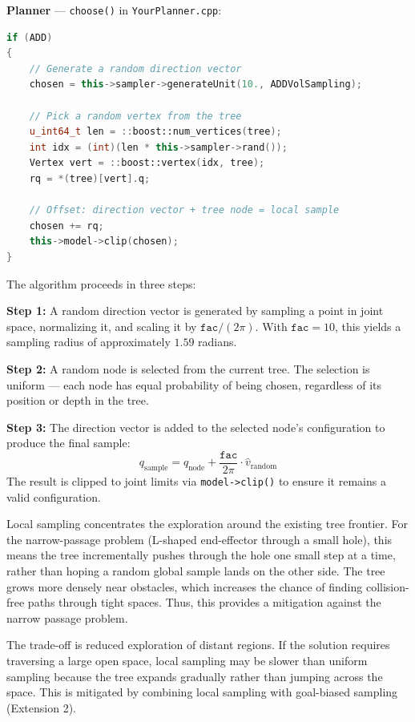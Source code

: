 \documentclass[a4paper,12pt]{article}
\begin{document}
\textbf{Planner} --- \texttt{choose()} in \texttt{YourPlanner.cpp}:
\begin{lstlisting}[language=C++, caption=Implementation of Extension 1]
if (ADD)
{
    // Generate a random direction vector
    chosen = this->sampler->generateUnit(10., ADDVolSampling);

    // Pick a random vertex from the tree
    u_int64_t len = ::boost::num_vertices(tree);
    int idx = (int)(len * this->sampler->rand());
    Vertex vert = ::boost::vertex(idx, tree);
    rq = *(tree)[vert].q;

    // Offset: direction vector + tree node = local sample
    chosen += rq;
    this->model->clip(chosen);
}
\end{lstlisting}
The algorithm proceeds in three steps:

\textbf{Step 1:} A random direction vector is generated by sampling a point in joint space, normalizing it, and scaling it by $\texttt{fac} / (2\pi)$. With $\texttt{fac} = 10$, this yields a sampling radius of approximately $1.59$ radians.

\textbf{Step 2:} A random node is selected from the current tree. The selection is uniform --- each node has equal probability of being chosen, regardless of its position or depth in the tree.

\textbf{Step 3:} The direction vector is added to the selected node's configuration to produce the final sample:
\[
    q_{\text{sample}} = q_{\text{node}} + \frac{\texttt{fac}}{2\pi} \cdot \hat{v}_{\text{random}}
\]
The result is clipped to joint limits via \texttt{model->clip()} to ensure it remains a valid configuration.

Local sampling concentrates the exploration around the existing tree frontier. For the narrow-passage problem (L-shaped end-effector through a small hole), this means the tree incrementally pushes through the hole one small step at a time, rather than hoping a random global sample lands on the other side. The tree grows more densely near obstacles, which increases the chance of finding collision-free paths through tight spaces. Thus, this provides a mitigation against the narrow passage problem.

The trade-off is reduced exploration of distant regions. If the solution requires traversing a large open space, local sampling may be slower than uniform sampling because the tree expands gradually rather than jumping across the space. This is mitigated by combining local sampling with goal-biased sampling (Extension 2).
\end{document}
